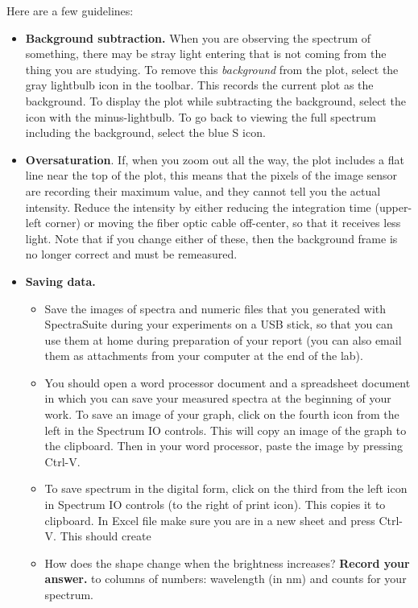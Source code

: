 Here are a few guidelines:
\begin{itemize}
	
	\item \textbf{Background subtraction.} When you are observing the spectrum of something, there may be stray light entering that is not coming from the thing you are studying. To remove this \textit{background} from the plot, select the gray lightbulb icon in the toolbar. This records the current plot as the background. To display the plot while subtracting the background, select the icon with the minus-lightbulb. To go back to viewing the full spectrum including the background, select the blue S icon.

	\item \textbf{Oversaturation}. If, when you zoom out all the way, the plot includes a flat line near the top of the plot, this means that the pixels of the image sensor are recording their maximum value, and they cannot tell you the actual intensity. Reduce the intensity by either reducing the integration time (upper-left corner) or moving the fiber optic cable off-center, so that it receives less light. Note that if you change either of these, then the background frame is no longer correct and must be remeasured.

	\item \textbf{Saving data.}
	
	\begin{itemize}
		\item Save the images of spectra and numeric files that you generated with SpectraSuite
	during your experiments on a USB stick, so that you can use them at home during
	preparation of your report (you can also email them as attachments from your
	computer at the end of the lab).
	
	\item You should open a word processor document and a spreadsheet document in which you can save your measured
	spectra at the beginning of your work. To save an image of your graph, click on
	the fourth icon from the left in the Spectrum IO controls. %
	This will copy
	an image of the graph to the clipboard. Then in your word processor, paste the image by pressing
	Ctrl-V.
	
	\item To save spectrum in the digital form, click on the third from the left icon in
	Spectrum IO controls (to the right of print icon). This copies it to clipboard. In
	Excel file make sure you are in a new sheet and press Ctrl-V. This should create\item How does the shape change when the brightness increases? \textbf{Record your answer.}
	to columns of numbers: wavelength (in nm) and counts for your spectrum.
	

\end{itemize}
\end{itemize}
